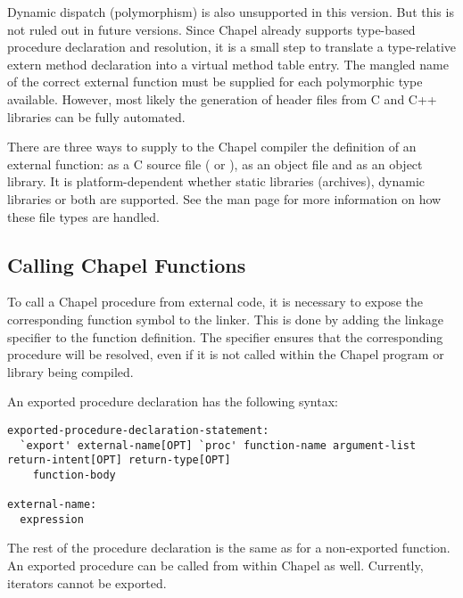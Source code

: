 \begin{future}
Dynamic dispatch (polymorphism) is also unsupported in this version.  But this
is not ruled out in future versions.  Since Chapel already supports type-based
procedure declaration and resolution, it is a small step to translate a
type-relative extern method declaration into a virtual method table entry.  The
mangled name of the correct external function must be supplied for each
polymorphic type available.  However, most likely the generation of 
header files from C and C++ libraries can be fully automated.
\end{future}

There are three ways to supply to the Chapel compiler the definition of an
external function: as a C source file ( or ), as an object
file and as an object library.  It is platform-dependent whether static
libraries (archives), dynamic libraries or both are supported.  See
the  man page for more information on how these file types are handled.

\subsection{Calling Chapel Functions}
\label{Calling_Chapel_Functions}

To call a Chapel procedure from external code, it is necessary to expose the
corresponding function symbol to the linker.  This is done by adding
the  linkage specifier to the function definition.
The  specifier ensures that the corresponding procedure will be
resolved, even if it is not called within the Chapel program or library being
compiled.

An exported procedure declaration has the following syntax:
\begin{syntax}
\begin{verbatim}
exported-procedure-declaration-statement:
  `export' external-name[OPT] `proc' function-name argument-list return-intent[OPT] return-type[OPT]
    function-body

external-name:
  expression
\end{verbatim}
\end{syntax}

The rest of the procedure declaration is the same as for a non-exported
function.  An exported procedure can be called from within Chapel as
well. Currently, iterators cannot be exported.

